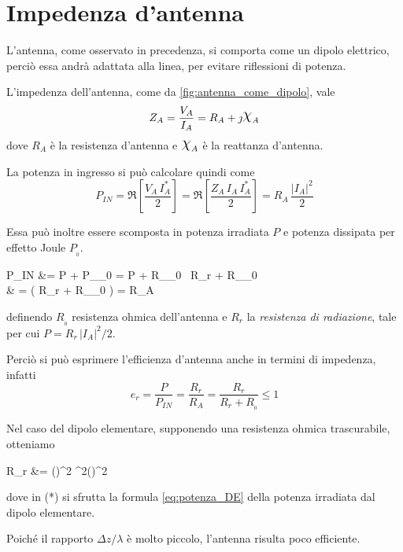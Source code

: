 \section{Impedenza d'antenna}
L'antenna, come osservato in precedenza, si comporta come un dipolo elettrico, perciò essa andrà adattata alla linea, per evitare riflessioni di potenza.

L'impedenza dell'antenna, come da \autoref{fig:antenna_come_dipolo}, vale
\begin{equation}
	Z_A = \frac{V_A}{I_A} = R_A + \jmath \Chi_A
\end{equation}
dove $R_A$ è la resistenza d'antenna e $\Chi_A$ è la reattanza d'antenna.

La potenza in ingresso si può calcolare quindi come
\begin{equation*}
	P_{IN}
	= \Re \left[ \frac{V_A \, I_A^*}{2} \right]
	= \Re \left[ \frac{Z_A \, I_A \, I_A^*}{2} \right]
	= R_A \, \frac{|I_A|^2}{2}
\end{equation*}

Essa può inoltre essere scomposta in potenza irradiata $P$ e potenza dissipata per effetto Joule $P_{_0}$.
\begin{esp*}
	P_{IN}
	&= P + P_{_0}
	= P + R_{_0} \, 
	\stackrel{(*)}{=} R_r  + R_{_0} \\
	& = \left( R_r + R_{_0}  \right) 
	= R_A \, 
\end{esp*}
definendo $R_{_0}$ resistenza ohmica dell'antenna e $R_r$ la \emph{resistenza di radiazione}, tale per cui $P=R_r \, |I_A|^2 / 2$.

Perciò si può esprimere l'efficienza d'antenna anche in termini di impedenza, infatti
\begin{equation*}
	e_r
	= \frac{P}{P_{IN}}
	= \frac{R_r}{R_A}
	= \frac{R_r}{R_r + R_{_0}}
	\le 1
\end{equation*}

Nel caso del dipolo elementare, supponendo una resistenza ohmica trascurabile, otteniamo

\begin{esp}\label{eq:pot-resRadDE}
	R_r
	&= 
	\stackrel{(*)}{=} \pi \eta \left(\right)^2
	\pi^2\left(\right)^2 \Omega
\end{esp}
dove in (*) si sfrutta la formula \autoref{eq:potenza_DE} della potenza irradiata dal dipolo elementare.

Poiché il rapporto $\Delta z / \lambda$ è molto piccolo, l'antenna risulta poco efficiente.

